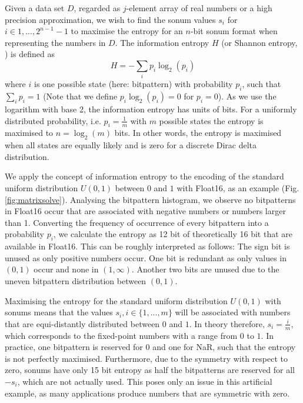 Given a data set $D$, regarded as $j$-element array of real numbers or a high precision approximation, we wish to find the sonum values $s_i$ for $i \in {1,...,2^{n-1}-1}$ to maximise the entropy for an $n$-bit sonum format when representing the numbers in $D$. The information entropy $H$ (or Shannon entropy, \cite{MacKay2003a}) is defined as
\begin{equation}
     H = -\sum_i p_i \log_2(p_i)
     \label{eq:entropy}
\end{equation}
where $i$ is one possible state (here: bitpattern) with probability $p_i$, such that $\sum_ip_i = 1$ (Note that we define $p_i \log_2(p_i) = 0$ for $p_i = 0$). As we use the logarithm with base 2, the information entropy has units of bits. For a uniformly distributed probability, i.e. $p_i = \tfrac{1}{m}$ with $m$ possible states the entropy is maximised to $n = \log_2(m)$ bits. In other words, the entropy is maximised when all states are equally likely and is zero for a discrete Dirac delta distribution.

We apply the concept of information entropy to the encoding of the standard uniform distribution $U(0,1)$ between $0$ and $1$ with Float16, as an example (Fig. \ref{fig:matrixsolve}). Analysing the bitpattern histogram, we observe no bitpatterns in Float16 occur that are associated with negative numbers or numbers larger than 1. Converting the frequency of occurrence of every bitpattern into a probability $p_i$, we calculate the entropy as 12 bit of theoretically 16 bit that are available in Float16. This can be roughly interpreted as follows: The sign bit is unused as only positive numbers occur. One bit is redundant as only values in $(0,1)$ occur and none in $(1,\infty)$. Another two bits are unused due to the uneven bitpattern distribution between $(0,1)$.

Maximising the entropy for the standard uniform distribution $U(0,1)$ with sonums means that the values $s_i, i \in \{1,...,m\}$ will be associated with numbers that are equi-distantly distributed between $0$ and $1$. In theory therefore, $s_i = \tfrac{i}{m}$, which corresponds to the fixed-point numbers with a range from $0$ to $1$. In practice, one bitpattern is reserved for $0$ and one for NaR, such that the entropy is not perfectly maximised. Furthermore, due to the symmetry with respect to zero, sonums have only 15 bit entropy as half the bitpatterns are reserved for all $-s_i$, which are not actually used. This poses only an issue in this artificial example, as many applications produce numbers that are symmetric with zero.

